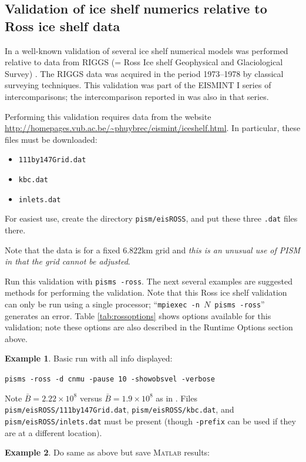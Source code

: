 \documentclass[12pt,final]{amsart}
\newcommand{\Matlab}{\textsc{Matlab}\xspace}
\begin{document}
\subsection{Validation of ice shelf numerics relative to Ross ice shelf data}  In \cite{MacAyealetal} a well-known validation of several ice shelf numerical models was performed relative to data from RIGGS (= Ross Ice shelf Geophysical and Glaciological Survey) \cite{RIGGS1,RIGGS2}.  The RIGGS data was acquired in the period 1973--1978 by classical surveying techniques.   This validation was part of the EISMINT I  series of intercomparisons; the intercomparison reported in \cite{EISMINT96} was also in that series.

Performing this validation requires data from the website \url{http://homepages.vub.ac.be/~phuybrec/eismint/iceshelf.html}.  In particular, these files must be downloaded:
\begin{itemize}
\item \verb|111by147Grid.dat|
\item \verb|kbc.dat|
\item \verb|inlets.dat|
\end{itemize}
For easiest use, create the directory \verb|pism/eisROSS|, and put these three \verb|.dat| files there.

Note that the data is for a fixed $6.822$km grid and \emph{this is an unusual use of PISM in that the grid cannot be adjusted}.

Run this validation with \verb|pisms -ross|.  The next several examples are suggested methods for performing the validation.  Note that this Ross ice shelf validation can only be run using a single processor; ``\verb|mpiexec -n |$N$\verb| pisms -ross|'' generates an error.  Table \ref{tab:rossoptions} shows options available for this validation; note these options are also described in the Runtime Options section above.

\bigskip
\noindent\textbf{Example 1}.  Basic run with all info displayed: 

\verb|pisms -ross -d cnmu -pause 10 -showobsvel -verbose|

\noindent Note $\bar B = 2.22 \times 10^8$ versus $\bar B = 1.9 \times 10^8$ as in \cite{MacAyealetal}.  Files \verb|pism/eisROSS/111by147Grid.dat|, \verb|pism/eisROSS/kbc.dat|, and \verb|pism/eisROSS/inlets.dat| must be present (though \verb|-prefix| can be used if they are at a different location).

\bigskip
\noindent\textbf{Example 2}.  Do same as above but save \Matlab results:
\end{document}
